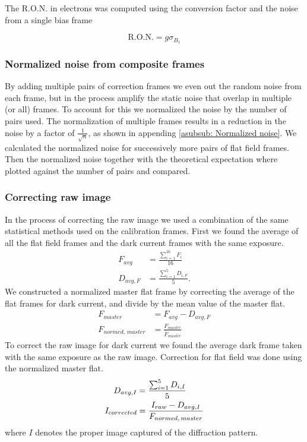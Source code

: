 \documentclass{emulateapj}
\begin{document}
The R.O.N. in electrons was computed using the conversion factor and the noise from a single bias frame

\begin{equation}
	\text{R.O.N.} = g\sigma_{B_1}
	\label{eq: R.O.N.}
\end{equation}

\subsubsection{Normalized noise from composite frames}
\label{subsubsec: Method/Normalized noise}
By adding multiple pairs of correction frames we even out the random noise from each frame, but in the process amplify the static noise that overlap in multiple (or all) frames. To account for this we normalized the noise by the number of pairs used. The normalization of multiple frames results in a reduction in the noise by a factor of $\frac{1}{\sqrt{n}}$, as shown in appending \ref{asubsub: Normalized noise}. We calculated the normalized noise for successively more pairs of flat field frames. Then the normalized noise together with the theoretical expectation where plotted against the number of pairs and compared. 

\subsubsection{Correcting raw image}
In the process of correcting the raw image we used a combination of the same statistical methods used on the calibration frames. First we found the average of all the flat field frames and the dark current frames with the same exposure.
\begin{align*}
	F_{avg} &= \frac{\sum_{i=1}^16 F_i}{16} 
	\\
	D_{avg,F} &= \frac{\sum_{i=1}^5 D_{i,F}}{5}.
\end{align*}
We constructed a normalized master flat frame by correcting the average of the flat frames for dark current, and divide by the mean value of the master flat.
\begin{align*}
	F_{master} &= F_{avg} - D_{avg,F}
	\\
	F_{normed,\, master} &=  \frac{F_{master}}{\overline{F}_{master}}
\end{align*}
To correct the raw image for dark current we found the average dark frame taken with the same exposure as the raw image. Correction for flat field was done using the normalized master flat.
\begin{align}
	D_{avg,I} &= \frac{\sum_{i=1}^5 D_{i,I}}{5}	\notag
	\\
	I_{corrected} &= \frac{I_{raw}-D_{avg,I}}{F_{normed,\, master}} \label{eq: Corrected image}
\end{align}
where $I$ denotes the proper image captured of the diffraction pattern.
\end{document}
